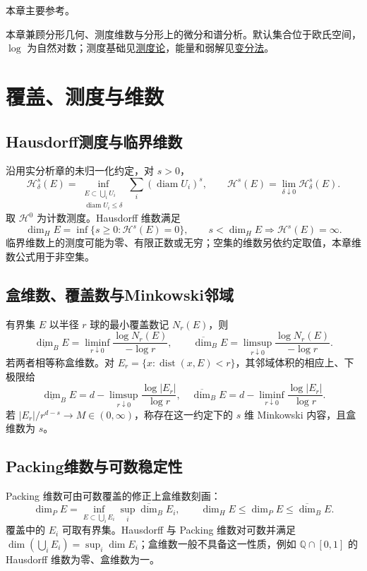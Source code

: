 \documentclass[../main.tex]{subfiles}
\begin{document}
本章主要参考\cite{falconer}。

本章兼顾分形几何、测度维数与分形上的微分和谱分析。默认集合位于欧氏空间，$\log$ 为自然对数；测度基础见\hyperref[chap:measure-theory]{测度论}，能量和弱解见\hyperref[chap:calculus-of-variations]{变分法}。
\section{覆盖、测度与维数}
\subsection{Hausdorff测度与临界维数}
沿用实分析章的未归一化约定，对 $s>0$，
\[
\mathcal H_\delta^s(E)=\inf_{\substack{E\subset\bigcup_iU_i\\\operatorname{diam}U_i\le\delta}}\sum_i(\operatorname{diam}U_i)^s,
\qquad\mathcal H^s(E)=\lim_{\delta\downarrow0}\mathcal H_\delta^s(E).
\]
取 $\mathcal H^0$ 为计数测度。Hausdorff 维数满足
\[
\dim_HE=\inf\{s\ge0:\mathcal H^s(E)=0\},\qquad
s<\dim_HE\Rightarrow\mathcal H^s(E)=\infty.
\]
临界维数上的测度可能为零、有限正数或无穷；空集的维数另依约定取值，本章维数公式用于非空集。
\subsection{盒维数、覆盖数与Minkowski邻域}
有界集 $E$ 以半径 $r$ 球的最小覆盖数记 $N_r(E)$，则
\[
\underline{\dim}_BE=\liminf_{r\downarrow0}\frac{\log N_r(E)}{-\log r},\qquad
\overline{\dim}_BE=\limsup_{r\downarrow0}\frac{\log N_r(E)}{-\log r}.
\]
若两者相等称盒维数。对 $E_r=\{x:\operatorname{dist}(x,E)<r\}$，其邻域体积的相应上、下极限给
\[
\underline{\dim}_BE=d-\limsup_{r\downarrow0}\frac{\log|E_r|}{\log r},\quad
\overline{\dim}_BE=d-\liminf_{r\downarrow0}\frac{\log|E_r|}{\log r}.
\]
若 $|E_r|/r^{d-s}\to M\in(0,\infty)$，称存在这一约定下的 $s$ 维 Minkowski 内容，且盒维数为 $s$。
\subsection{Packing维数与可数稳定性}
Packing 维数可由可数覆盖的修正上盒维数刻画：
\[
\dim_PE=\inf_{E\subset\bigcup_iE_i}\sup_i\overline{\dim}_BE_i,
\qquad\dim_HE\le\dim_PE\le\overline{\dim}_BE.
\]
覆盖中的 $E_i$ 可取有界集。Hausdorff 与 Packing 维数对可数并满足 $\dim(\bigcup_iE_i)=\sup_i\dim E_i$；盒维数一般不具备这一性质，例如 $\mathbb Q\cap[0,1]$ 的 Hausdorff 维数为零、盒维数为一。
\end{document}
